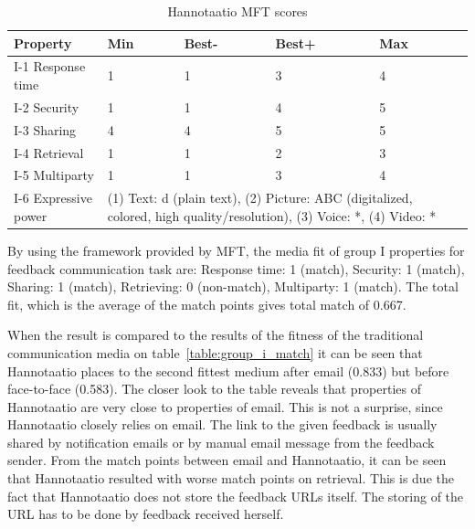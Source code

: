 \documentclass[english,12pt,a4paper,pdftex]{article}
\begin{document}
\begin{table}[!h]
\renewcommand{\arraystretch}{1.3}
\caption{Hannotaatio \ac{MFT} scores}
\label{table:hannotaatio_mft_scores}
\centering
\begin{tabular}{|p{3cm}|p{2cm}|p{2cm}|p{2cm}|p{2cm}|p{2cm}|}
\hline
\textbf{Property} & \textbf{Min} & \textbf{Best-} & \textbf{Best+} & \textbf{Max}\\
\hline
I-1 Response time & 1 & 1 & 3 & 4 \\
\hline
I-2 Security & 1 & 1 & 4 & 5 \\
\hline
I-3 Sharing & 4 & 4 & 5 & 5 \\
\hline
I-4 Retrieval & 1 & 1 & 2 & 3 \\
\hline
I-5 Multiparty & 1 & 1 & 3 & 4 \\
\hline
I-6 Expressive power & \multicolumn{4}{|p{10cm}|}{(1) Text: d (plain text), (2) Picture: ABC (digitalized, colored, high quality/resolution), (3) Voice: *, (4) Video: * } \\
\hline
\end{tabular}
\end{table}

By using the framework provided by \ac{MFT}, the media fit of group I properties for feedback communication task are: Response time: 1 (match), Security: 1 (match), Sharing: 1 (match), Retrieving: 0 (non-match), Multiparty: 1 (match). The total fit, which is the average of the match points gives total match of 0.667.

When the result is compared to the results of the fitness of the traditional communication media on table~\ref{table:group_i_match} it can be seen that Hannotaatio places to the second fittest medium after email (0.833) but before face-to-face (0.583). The closer look to the table reveals that properties of Hannotaatio are very close to properties of email. This is not a surprise, since Hannotaatio closely relies on email. The link to the given feedback is usually shared by notification emails or by manual email message from the feedback sender. From the match points between email and Hannotaatio, it can be seen that Hannotaatio resulted with worse match points on retrieval. This is due the fact that Hannotaatio does not store the feedback \acs{URL}s itself. The storing of the \ac{URL} has to be done by feedback received herself.
\end{document}
